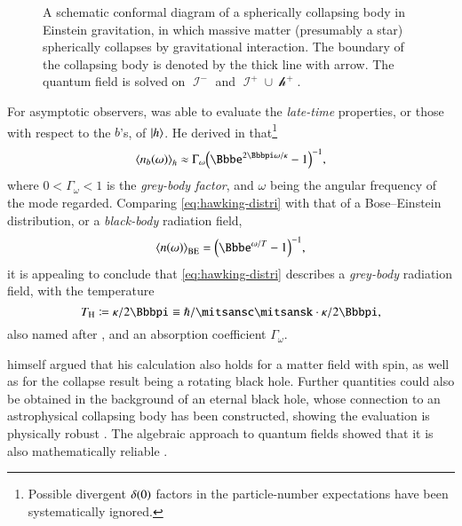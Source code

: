 \begin{figure}
\begin{center}

\end{center}
\caption[Spherically collapsing body in Einstein gravitation]{A schematic 
conformal diagram of a spherically collapsing body in Einstein gravitation, in 
which massive matter (presumably a star) spherically collapses by gravitational 
interaction. The boundary of the collapsing body is denoted by the thick
line with arrow. The quantum field is solved on $\mscrI^-$ and $\mscrI^+ \cup 
\mscrh^+$. \label{fig:sph-col-bod}}
\end{figure}

For asymptotic observers, \citeauthor{Hawking1975} was able to evaluate the 
\emph{late-time} properties, or those with respect to the $b$'s, of 
$\Ket{h}$. He derived in \cite{Hawking1975} that\footnote{Possible divergent 
${\delta}\mathopen{}\left(0\right)\mathclose{}$ factors in the particle-number expectations have been 
systematically ignored.}
\begin{equation}
\abr{\rfun{{n}_b}{\omega}}_h \approx
\Gamma_\omega\rbr{\ee^{2\pp\omega/\kappa}-1}^{-1},
\label{eq:hawking-distri}
\end{equation}
where $0 < \Gamma_\omega < 1$ is the \emph{grey-body factor}, and $\omega$ 
being the angular frequency of the mode regarded. Comparing 
\cref{eq:hawking-distri} with that of a Bose--Einstein distribution, or a 
\emph{black-body} radiation field,
\begin{equation}
\abr{\rfun{{n}}{\omega}}_\text{BE} = \rbr{\ee^{\omega/T} - 1}^{-1},
\end{equation}
it is appealing to conclude that \cref{eq:hawking-distri} describes a 
\emph{grey-body} radiation field, with the temperature
\begin{equation}
T_\text{H} \coloneqq \kappa/2\pp \equiv \phs/\lc \bk \cdot \kappa/2\pp,
\label{eq:hawking-temperature}
\end{equation}
also named after \citeauthor{Hawking1975}, and an absorption coefficient 
$\Gamma_\omega$.

\citeauthor{Hawking1975} himself argued that his calculation also holds for 
a matter field with spin, as well as for the collapse result being a rotating 
black hole. Further quantities could also be obtained in the background of 
an eternal black hole, whose connection to an astrophysical collapsing body 
has been constructed, showing the evaluation is physically robust 
\cite{Candelas1980}. The algebraic approach to quantum fields showed that it is 
also mathematically reliable \cite{Hollands2015}.

